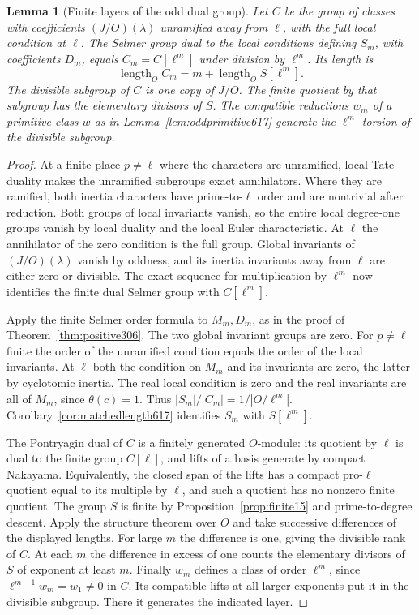 \documentclass[a4paper,11pt]{article}
\newtheorem{lemma}[proposition]{Lemma}
\theoremstyle{definition}
\theoremstyle{remark}
\numberwithin{equation}{section}
\begin{document}
\begin{lemma}[Finite layers of the odd dual group]\label{lem:oddlayers618}
Let \(C\) be the group of classes with coefficients
\((J/O)(\lambda)\) unramified away from \(\ell\), with the full
local condition at \(\ell\). The Selmer group dual to the local
conditions defining \(S_m\), with coefficients \(D_m\), equals
\(C_m=C[\ell^m]\) under division by \(\ell^m\). Its length is
\[
             \operatorname{length}_O C_m
               =m+\operatorname{length}_O S[\ell^m].
\]
The divisible subgroup of \(C\) is one copy of \(J/O\).
The finite quotient by that subgroup has the elementary divisors
of \(S\). The compatible reductions \(w_m\) of a primitive
class \(w\) as in Lemma~\ref{lem:oddprimitive617} generate the
\(\ell^m\)-torsion of the divisible subgroup.
\end{lemma}
\begin{proof}
At a finite place \(p\ne\ell\) where the characters are unramified,
local Tate duality makes the unramified subgroups exact annihilators.
Where they are ramified, both inertia characters have prime-to-\(\ell\)
order and are nontrivial after reduction. Both groups of local
invariants vanish, so the entire local degree-one groups vanish by
local duality and the local Euler characteristic. At \(\ell\) the
annihilator of the zero condition is the full group. Global
invariants of \((J/O)(\lambda)\) vanish by oddness, and its inertia
invariants away from \(\ell\) are either zero or divisible.
The exact sequence for multiplication by \(\ell^m\) now identifies
the finite dual Selmer group with \(C[\ell^m]\).

Apply the finite Selmer order formula to \(M_m,D_m\), as in the
proof of Theorem~\ref{thm:positive306}. The two global invariant
groups are zero. For \(p\ne\ell\) finite the order of the unramified
condition equals the order of the local invariants. At \(\ell\)
both the condition on \(M_m\) and its invariants are zero, the
latter by cyclotomic inertia. The real local condition is zero
and the real invariants are all of \(M_m\), since \(\theta(c)=1\).
Thus \(|S_m|/|C_m|=1/|O/\ell^m|\). Corollary~\ref{cor:matchedlength617}
identifies \(S_m\) with \(S[\ell^m]\).~\cite{IV-II-II-duality13}

The Pontryagin dual of \(C\) is a finitely generated \(O\)-module:
its quotient by \(\ell\) is dual to the finite group \(C[\ell]\),
and lifts of a basis generate by compact Nakayama. Equivalently,
the closed span of the lifts has a compact pro-\(\ell\) quotient
equal to its multiple by \(\ell\), and such a quotient has no
nonzero finite quotient. The group \(S\) is finite by
Proposition~\ref{prop:finite15} and prime-to-degree descent.
Apply the structure theorem over \(O\) and take successive
differences of the displayed lengths. For large \(m\) the
difference is one, giving the divisible rank of \(C\). At each
\(m\) the difference in excess of one counts the elementary
divisors of \(S\) of exponent at least \(m\). Finally \(w_m\)
defines a class of order \(\ell^m\), since
\(\ell^{m-1}w_m=w_1\ne0\) in \(C\). Its compatible lifts at all
larger exponents put it in the divisible subgroup. There it
generates the indicated layer.
\end{proof}
\end{document}
